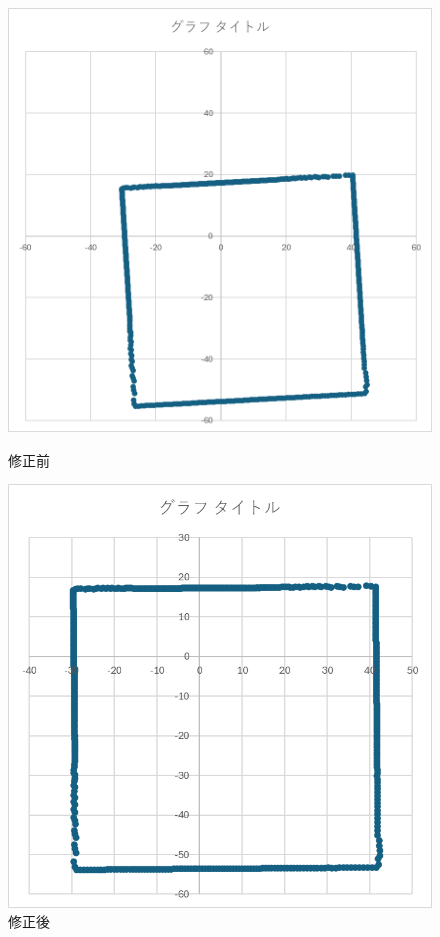 \documentclass[uplatex,dvipdfmx,a4paper]{jsarticle}
\begin{document}
    \begin{figure}[H]
      \begin{minipage}[b]{0.45\linewidth}
        \centering
        \includegraphics[keepaspectratio, scale=0.5]{Photo/image-8.png}
        \caption{修正前}
      \end{minipage}
      \begin{minipage}[b]{0.45\linewidth}
        \centering
        \includegraphics[keepaspectratio, scale=0.5]{Photo/image-9.png}
        \caption{修正後}
      \end{minipage}
    \end{figure}
\end{document}
